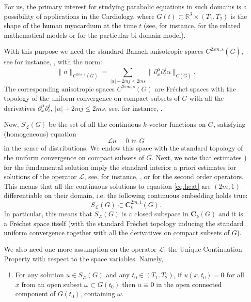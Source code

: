 \documentclass{amsart}
\theoremstyle{definition}
\theoremstyle{remark}
\numberwithin{equation}{section}
\begin{document}
For us, the primary interest for studying parabolic equations in such domains 
is a possibility of applications in the Cardiology, where $G(t) \subset 
{\mathbb R}^3 \times (T_1,T_2)$ is the shape of the human 
myocardium at the time $t$ (see, for instance, \cite{Beheshti2016} for the related 
mathematical models or \cite{KSU_ZAMM} for the particular bi-domain model). 

With this purpose  we need the standard Banach anisotropic spaces $C^{2sm,s} (\overline G)$, see for instance, \cite[\S 22]{sol}, with the norm: 
$$
\|u\|_{C^{2ms,s} (\overline G)} = \sum_{|\alpha|+2mj\leq 2ms} 
\|\partial^\alpha_x \partial^j_t  u\|_{C (\overline G) }.
$$ 
The corresponding anisotropic spaces $C^{2sm,s} (G)$ are Fr\'echet spaces with the topology 
of the uniform convergence on compact subsets of $G$ with all the derivatives $\partial_x
^\alpha \partial _t ^j$, $|\alpha|+ 2mj\leq 2ms$, see, for instance, \cite{Sch71}.

Now, $S _{\mathcal L}(G)$ be the set of all the %
continuous $k$-vector functions on $G$, satisfying (homogeneous)  equation
\begin{equation} \label{eq.heat}
{\mathcal L} u = 0 \mbox{ in } G 
\end{equation}
in the sense of distributions. We endow this space  with the standard  topology of the 
uniform convergence on compact subsets of $G$. Next, we note that estimates  
\cite[formulas (2.16), (2.17)]{eid}) for the fundamental solution imply the standard interior 
a priori estimates for solutions of the operator $\mathcal L$, see, for instance, 
\cite[\S 19]{sol}, or \cite[Ch. 4, \S 2]{frid} for the second order operators. This means 
that all the continuous solutions to equation \eqref{eq.heat} are $(2m,1)$-differentiable on 
their domain, i.e. the following continuous embedding holds true:
$$
S _{\mathcal L}(G) \subset \mathbf{C}^{2m,1} _k (G).
$$ 
In particular, this means that $S _{\mathcal L}(G)$ is a closed subspace 
in $\mathbf{C} _k (G)$ and it is a Fr\'echet space itself (with the 
standard Fr\'echet topology inducing the standard uniform convergence together with all the 
derivatives on compact subsets of $G$). 

We also need one more assumption on the operator $\mathcal L$: the Unique Continuation 
Property with respect to the space variables. Namely, 
\begin{enumerate}
\item[$(UCP)$] For any solution $u \in S _{\mathcal L}(G)$ and any 
$t_0 \in (T_1,T_2)$, if $u (x,t_0)= 0$  for all $x$ from an open 
 subset $\omega \subset G (t_0)$ then $u \equiv 0$ in the open connected component 
of $G (t_0)$, containing $\omega$.
\end{enumerate}
\end{document}
